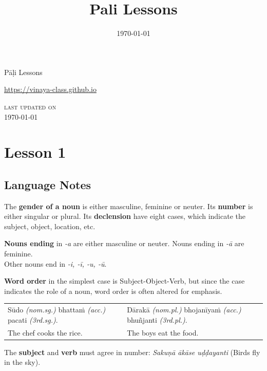 \documentclass[11pt,oneside]{memoir}
\date{\today}
\title{Pali Lessons}
\begin{document}
\maketitle
\frontmatter

{\centering

{\Huge Pāḷi Lessons}

\bigskip
\href{https://vinaya-class.github.io}{https://vinaya-class.github.io}

{\scshape\small last updated on}\\
\today

}

\newlength{\colOne}\setlength{\colOne}{0.35\linewidth}
\newlength{\colTwo}\setlength{\colTwo}{0.6\linewidth}

\bigskip
\tableofcontents*

\mainmatter

\chapter{Lesson 1}
\label{sec:orga27b158}
\section{Language Notes}
\label{sec:org0c30a11}

The \textbf{gender of a noun} is either masculine, feminine or neuter.
Its \textbf{number} is either singular or plural.
Its \textbf{declension} have eight cases, which indicate the subject, object, location, etc.

\textbf{Nouns ending} in \emph{-a} are either masculine or neuter. Nouns ending in \emph{-ā} are feminine.\\[0pt]
Other nouns end in \emph{-i, -ī, -u, -ū}.

\textbf{Word order} in the simplest case is Subject-Object-Verb, but since the case indicates the role of a noun, word order is often altered for emphasis.

\begin{center}
\begin{tabular}{ll}
Sūdo \emph{(nom.sg.)} bhattaṁ \emph{(acc.)} pacati \emph{(3rd.sg.)}. & Dārakā \emph{(nom.pl.)} bhojanīyaṁ \emph{(acc.)} bhuñjanti \emph{(3rd.pl.)}.\\[0pt]
The chef cooks the rice. & The boys eat the food.\\[0pt]
\end{tabular}
\end{center}

The \textbf{subject} and \textbf{verb} must agree in number: \emph{Sakuṇā ākāse uḍḍayanti} (Birds fly in the sky).
\end{document}
